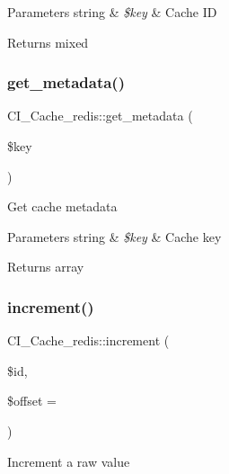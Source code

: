 \begin{DoxyParams}[1]{Parameters}
string & {\em \$key} & Cache ID \\
\hline
\end{DoxyParams}
\begin{DoxyReturn}{Returns}
mixed 
\end{DoxyReturn}
\mbox{\label{class_c_i___cache__redis_abf71c98c96df2cf2f0ad68a9ae434bc3}} 
\subsubsection{\texorpdfstring{get\+\_\+metadata()}{get\_metadata()}}
{\footnotesize\ttfamily C\+I\+\_\+\+Cache\+\_\+redis\+::get\+\_\+metadata (\begin{DoxyParamCaption}\item[{}]{\$key }\end{DoxyParamCaption})}

Get cache metadata


\begin{DoxyParams}[1]{Parameters}
string & {\em \$key} & Cache key \\
\hline
\end{DoxyParams}
\begin{DoxyReturn}{Returns}
array 
\end{DoxyReturn}
\mbox{\label{class_c_i___cache__redis_ac3ead3bec93a06fff90cf4068ff0bf8c}} 
\subsubsection{\texorpdfstring{increment()}{increment()}}
{\footnotesize\ttfamily C\+I\+\_\+\+Cache\+\_\+redis\+::increment (\begin{DoxyParamCaption}\item[{}]{\$id,  }\item[{}]{\$offset = {} }\end{DoxyParamCaption})}

Increment a raw value


